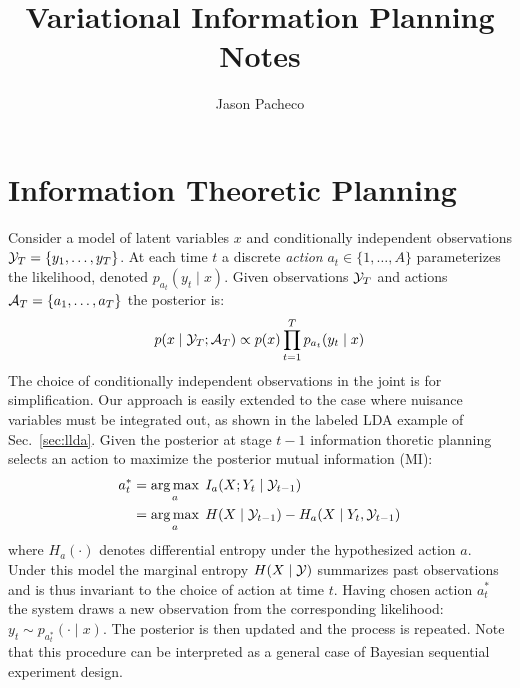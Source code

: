 \documentclass{article}
\begin{document}
\title{Variational Information Planning Notes}
\author{Jason Pacheco}
\maketitle

\section{Information Theoretic Planning}

Consider a model of latent variables $x$ and conditionally
independent observations $\mathcal{Y}_T = \{y_1,\ldots,y_T\}$.  At each time
$t$ a discrete \emph{action} $a_t \in \{1,\ldots,A\}$ parameterizes
the likelihood, denoted \mbox{$p_{a_t}(y_t \mid x)$}.  Given
observations $\mathcal{Y}_T$ and actions $\mathcal{A}_T = \{a_1,\ldots,a_T\}$
the posterior is:
\begin{equation}\label{eq:joint}
  p(x\mid \mathcal{Y}_T; \mathcal{A}_T) \propto p(x) \prod_{t=1}^T p_{a_t}(y_t \mid x)
\end{equation}
The choice of conditionally independent observations in the joint is
for simplification.  Our approach is easily extended to the case where
nuisance variables must be integrated out, as shown in the labeled LDA
example of Sec.~\ref{sec:llda}.  Given the posterior at stage $t-1$
information thoretic planning selects an action to maximize the
posterior mutual information (MI):
\begin{align}\label{eq:mi_integral}
  a_t^{*} &= \operatorname*{arg\,max}_{a} \;I_a(X; Y_t \mid \mathcal{Y}_{t-1} ) \\
  &= \operatorname*{arg\,max}_{a} \;H(X \mid \mathcal{Y}_{t-1} ) - H_a(X \mid Y_t, \mathcal{Y}_{t-1}) \notag
\end{align}
where $H_a( \cdot )$ denotes differential entropy under the
hypothesized action $a$.  Under this model the marginal entropy
$H(X\mid \mathcal{Y})$ summarizes past observations and is thus invariant to
the choice of action at time $t$.  Having chosen action $a^{*}_t$ the
system draws a new observation from the corresponding likelihood: $y_t
\sim p_{a^{*}_t}(\cdot \mid x)$.  The posterior is then updated and
the process is repeated.  Note that this procedure can be interpreted
as a general case of Bayesian sequential experiment design.
\end{document}
